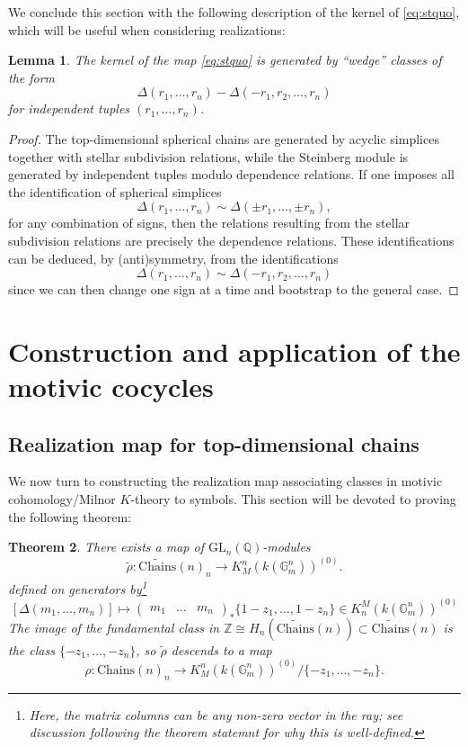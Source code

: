 \documentclass[10pt]{amsart}
\newtheorem{thm}{Theorem}[section]
\newtheorem{lem}[thm]{Lemma}
\theoremstyle{definition}
\newcommand{\Z}{\mathbb{Z}}
\newcommand{\Chains}{\mathrm{Chains}}
\numberwithin{equation}{section}
\begin{document}
    We conclude this section with the following description of the kernel of \eqref{eq:stquo}, which will be useful when considering realizations:
    \begin{lem} \label{lem:stquo}
        The kernel of the map \eqref{eq:stquo} is generated by ``wedge'' classes of the form
        \[
        \Delta(r_1,\ldots, r_n)-\Delta(-r_1,r_2,\ldots,r_n)
        \]
        for independent tuples $(r_1,\ldots, r_n)$.
    \end{lem}
    \begin{proof}
        The top-dimensional spherical chains are generated by acyclic simplices together with stellar subdivision relations, while the Steinberg module is generated by independent tuples modulo dependence relations. If one imposes all the identification of spherical simplices
        \[
        \Delta(r_1,\ldots, r_n)\sim \Delta(\pm r_1,\ldots, \pm r_n),
        \]
        for any combination of signs, then the relations resulting from the stellar subdivision relations are precisely the dependence relations. These identifications can be deduced, by (anti)symmetry, from the identifications
        \[
        \Delta(r_1,\ldots, r_n)\sim \Delta(-r_1,r_2,\ldots,r_n)
        \]
        since we can then change one sign at a time and bootstrap to the general case.
    \end{proof}

    \section{Construction and application of the motivic cocycles} \label{section:motivictheta}

    \subsection{Realization map for top-dimensional chains} \label{section:realization}

    We now turn to constructing the realization map associating classes in motivic cohomology/Milnor $K$-theory to symbols. This section will be devoted to proving the following theorem:
    
    \begin{thm} \label{thm:gerssym}
    There exists a map of $\mathrm{GL}_n(\mathbb{Q})$-modules
    \[\tilde{\rho}:\widetilde{\Chains}(n)_{n} \to K_M^n(k(\mathbb{G}_m^n))^{(0)}.\]
    defined on generators by\footnote{Here, the matrix columns can be any non-zero vector in the ray; see discussion following the theorem statemnt for why this is well-defined.}
    \begin{equation} \label{eq:gerssymdef}
    [\Delta(m_1,\ldots, m_n)] \mapsto \begin{pmatrix}m_1&\ldots & m_n\end{pmatrix}_* \{1-z_1,\ldots, 1-z_n\} \in K_n^M(k(\mathbb{G}_m^n))^{(0)}
    \end{equation}
    The image of the fundamental class in $\Z\cong H_{n}(\widetilde{\Chains}(n))\subset \widetilde{\Chains}(n)$ 
    is the class $\{-z_1,\ldots, -z_n\}$, so $\tilde{\rho}$ descends to a map
    \[\rho:\Chains(n)_{n} \to K_M^n(k(\mathbb{G}_m^n))^{(0)}/\{-z_1,\ldots, -z_n\}.\]
    \end{thm}
    
\end{document}
